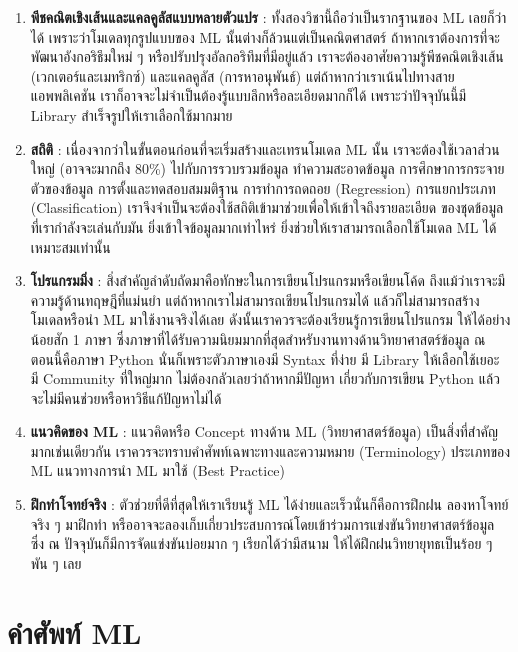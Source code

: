 \begin{enumerate}
    \item \textbf{พีชคณิตเชิงเส้นและแคลคูลัสแบบหลายตัวแปร} : ทั้งสองวิชานี้ถือว่าเป็นรากฐานของ ML เลยก็ว่าได้ 
    เพราะว่าโมเดลทุกรูปแบบของ ML นั้นต่างก็ล้วนแต่เป็นคณิตศาสตร์ ถ้าหากเราต้องการที่จะพัฒนาอังกอริธึมใหม่ ๆ 
    หรือปรับปรุงอัลกอริทึมที่มีอยู่แล้ว เราจะต้องอาศัยความรู้พีชคณิตเชิงเส้น (เวกเตอร์และเมทริกซ์) และแคลคูลัส (การหาอนุพันธ์) 
    แต่ถ้าหากว่าเราเน้นไปทางสายแอพพลิเคชัน เราก็อาจจะไม่จำเป็นต้องรู้แบบลึกหรือละเอียดมากก็ได้ เพราะว่าปัจจุบันนี้มี Library สำเร็จรูปให้เราเลือกใช้มากมาย
    \item \textbf{สถิติ} : เนื่องจากว่าในขั้นตอนก่อนที่จะเริ่มสร้างและเทรนโมเดล ML นั้น เราจะต้องใช้เวลาส่วนใหญ่ 
    (อาจจะมากถึง 80\%) ไปกับการรวบรวมข้อมูล ทำความสะอาดข้อมูล การศึกษาการกระจายตัวของข้อมูล การตั้งและทดสอบสมมติฐาน 
    การทำการถดถอย (Regression) การแยกประเภท (Classification) เราจึงจำเป็นจะต้องใช้สถิติเข้ามาช่วยเพื่อให้เข้าใจถึงรายละเอียด
    ของชุดข้อมูลที่เรากำลังจะเล่นกับมัน ยิ่งเข้าใจข้อมูลมากเท่าไหร่ ยิ่งช่วยให้เราสามารถเลือกใช้โมเดล ML ได้เหมาะสมเท่านั้น 
    \item \textbf{โปรแกรมมิ่ง} : สิ่งสำคัญลำดับถัดมาคือทักษะในการเขียนโปรแกรมหรือเขียนโค้ด ถึงแม้ว่าเราจะมีความรู้ด้านทฤษฎีที่แม่นยำ 
    แต่ถ้าหากเราไม่สามารถเขียนโปรแกรมได้ แล้วก็ไม่สามารถสร้างโมเดลหรือนำ ML มาใช้งานจริงได้เลย ดังนั้นเราควรจะต้องเรียนรู้การเขียนโปรแกรม
    ให้ได้อย่างน้อยสัก 1 ภาษา ซึ่งภาษาที่ได้รับความนิยมมากที่สุดสำหรับงานทางด้านวิทยาศาสตร์ข้อมูล ณ ตอนนี้คือภาษา Python 
    นั่นก็เพราะตัวภาษาเองมี Syntax ที่ง่าย มี Library ให้เลือกใช้เยอะ มี Community ที่ใหญ่มาก ไม่ต้องกลัวเลยว่าถ้าหากมีปัญหา
    เกี่ยวกับการเขียน Python แล้วจะไม่มีคนช่วยหรือหาวิธีแก้ปัญหาไม่ได้
    \item \textbf{แนวคิดของ ML} : แนวคิดหรือ Concept ทางด้าน ML (วิทยาศาสตร์ข้อมูล) เป็นสิ่งที่สำคัญมากเช่นเดียวกัน
    เราควรจะทราบคำศัพท์เฉพาะทางและความหมาย (Terminology) ประเภทของ ML แนวทางการนำ ML มาใช้ (Best Practice)
    \item \textbf{ฝึกทำโจทย์จริง} : ตัวช่วยที่ดีที่สุดให้เราเรียนรู้ ML ได้ง่ายและเร็วนั่นก็คือการฝึกฝน ลองหาโจทย์จริง ๆ มาฝึกทำ
    หรืออาจจะลองเก็บเกี่ยวประสบการณ์โดยเข้าร่วมการแข่งขันวิทยาศาสตร์ข้อมูล ซึ่ง ณ ปัจจุบันก็มีการจัดแข่งขันบ่อยมาก ๆ เรียกได้ว่ามีสนาม
    ให้ได้ฝึกฝนวิทยายุทธเป็นร้อย ๆ พัน ๆ เลย
\end{enumerate}

\section{คำศัพท์ ML}

